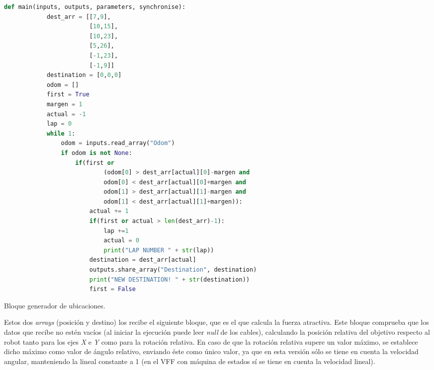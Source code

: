 \begin{code}[H]
    \begin{lstlisting}[language=python]
        def main(inputs, outputs, parameters, synchronise):
            dest_arr = [[7,9],
                        [10,15],
                        [10,23],
                        [5,26],
                        [-1,23],
                        [-1,9]]
            destination = [0,0,0]
            odom = []
            first = True
            margen = 1
            actual = -1
            lap = 0
            while 1:
                odom = inputs.read_array("Odom")
                if odom is not None:
                    if(first or 
                            (odom[0] > dest_arr[actual][0]-margen and 
                            odom[0] < dest_arr[actual][0]+margen and
                            odom[1] > dest_arr[actual][1]-margen and 
                            odom[1] < dest_arr[actual][1]+margen)):
                        actual += 1
                        if(first or actual > len(dest_arr)-1):
                            lap +=1
                            actual = 0    
                            print("LAP NUMBER " + str(lap)) 
                        destination = dest_arr[actual]
                        outputs.share_array("Destination", destination)
                        print("NEW DESTINATION! " + str(destination))
                        first = False
    \end{lstlisting}
    \caption[Bloque generador de ubicaciones]{Bloque generador de ubicaciones.}
    \label{cod:dest_gen}
\end{code}

Estos dos \textit{arrays} (posición y destino) los recibe el siguiente bloque, que es el que calcula la fuerza atractiva. Este bloque comprueba que
los datos que recibe no estén vacíos (al iniciar la ejecución puede leer \textit{null} de los cables), calculando la posición relativa del objetivo
respecto al robot tanto para los ejes \textit{X} e \textit{Y} como para la rotación relativa. En caso de que la rotación relativa supere un valor máximo,
se establece dicho máximo como valor de ángulo relativo, enviando éste como único valor, ya que en esta versión sólo se tiene en cuenta la velocidad angular,
manteniendo la lineal constante a 1 (en el VFF con máquina de estados sí se tiene en cuenta la velocidad lineal).

